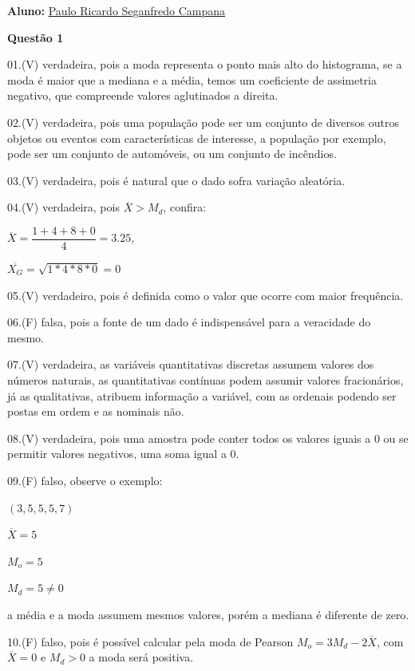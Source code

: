 \documentclass[12pt]{article}   %
\begin{document}
\par \textbf{Aluno:} \underline{Paulo Ricardo Seganfredo Campana}
\vspace{+12pt}
\par \textbf{Questão 1}
\vspace{+12pt}
\par 01.(V) verdadeira, pois a moda representa o ponto mais alto do histograma, se a moda é maior que a mediana e a média, temos um coeficiente de assimetria negativo, que compreende valores aglutinados a direita.
\par 02.(V) verdadeira, pois uma população pode ser um conjunto de diversos outros objetos ou eventos com características de interesse, a população por exemplo, pode ser um conjunto de automóveis, ou um conjunto de incêndios.
\par 03.(V) verdadeira, pois é natural que o dado sofra variação aleatória.
\par 04.(V) verdadeira, pois $\overline{X}>M_{d}$, confira: 
\vspace{+6pt}
\par $\overline{X} = \dfrac{1+4+8+0}{4} = 3.25$,
\vspace{+6pt}
\par $\overline{X_G} = \sqrt{1*4*8*0} = 0$
\vspace{+6pt}
\par 05.(V) verdadeiro, pois é definida como o valor que ocorre com maior frequência.
\par 06.(F) falsa, pois a fonte de um dado é indispensável para a veracidade do mesmo.
\par 07.(V) verdadeira, as variáveis quantitativas discretas assumem valores dos números naturais, as quantitativas contínuas podem assumir valores fracionários, já as qualitativas, atribuem informação a variável, com as ordenais podendo ser postas em ordem e as nominais não.
\par 08.(V) verdadeira, pois uma amostra pode conter todos os valores iguais a $0$ ou se permitir valores negativos, uma soma igual a 0.
\par 09.(F) falso, observe o exemplo:
\vspace{+6pt}
\par $(3,5,5,5,7)$
\par $\overline{X} = 5$
\par $M_o = 5$
\par $M_d = 5 \neq 0$
\par a média e a moda assumem mesmos valores, porém a mediana é diferente de zero.
\par 10.(F) falso, pois é possível calcular pela moda de Pearson $M_o = 3M_d - 2\overline{X}$, com $\overline{X} = 0$ e $M_d > 0$ a moda será positiva.
\end{document}
